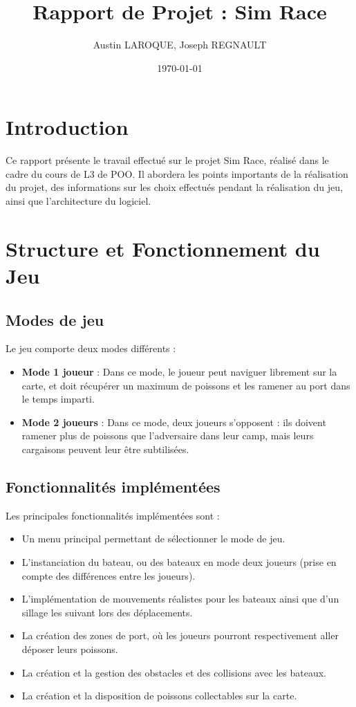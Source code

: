 \documentclass[a4paper,12pt]{article}
\title{Rapport de Projet : Sim Race}
\author{Austin LAROQUE, Joseph REGNAULT}
\date{\today}
\begin{document}
\maketitle

\tableofcontents

\newpage

\section{Introduction}
Ce rapport présente le travail effectué sur le projet Sim Race, réalisé dans le cadre du cours de L3 de POO. Il abordera les points importants de la réalisation du projet, des informations sur les choix effectués pendant la réalisation du jeu, ainsi que l'architecture du logiciel.

\section{Structure et Fonctionnement du Jeu}

\subsection{Modes de jeu}
Le jeu comporte deux modes différents :
\begin{itemize}
    \item \textbf{Mode 1 joueur} : Dans ce mode, le joueur peut naviguer librement sur la carte, et doit récupérer un maximum de poissons et les ramener au port dans le temps imparti.
    \item \textbf{Mode 2 joueurs} : Dans ce mode, deux joueurs s'opposent : ils doivent ramener plus de poissons que l'adversaire dans leur camp, mais leurs cargaisons peuvent leur être subtilisées.
\end{itemize}

\subsection{Fonctionnalités implémentées}
Les principales fonctionnalités implémentées sont :
\begin{itemize}
    \item Un menu principal permettant de sélectionner le mode de jeu.
    \item L'instanciation du bateau, ou des bateaux en mode deux joueurs (prise en compte des différences entre les joueurs).
    \item L'implémentation de mouvements réalistes pour les bateaux ainsi que d'un sillage les suivant lors des déplacements.
    \item La création des zones de port, où les joueurs pourront respectivement aller déposer leurs poissons.
    \item La création et la gestion des obstacles et des collisions avec les bateaux.
    \item La création et la disposition de poissons collectables sur la carte.
    
\end{itemize}
\end{document}

